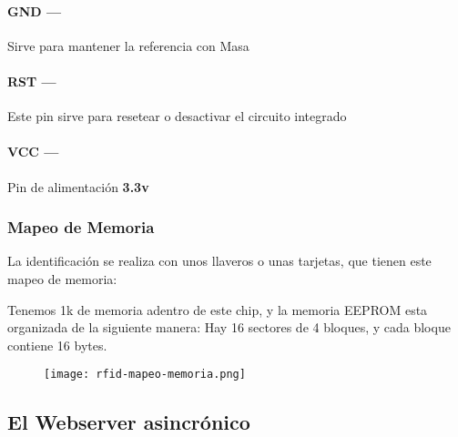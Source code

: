 \documentclass[../informe_krapp.tex]{subfiles}
\begin{document}
\paragraph{GND ---}
Sirve para mantener la referencia con Masa

\paragraph{RST ---}
Este pin sirve para resetear o desactivar el circuito integrado

\paragraph{VCC ---}
Pin de alimentación \textbf{3.3v}

\clearpage
\subsubsection{Mapeo de Memoria}
La identificación se realiza con unos llaveros o unas tarjetas,
que tienen este mapeo de memoria:

Tenemos 1k de memoria adentro de este chip, y la memoria EEPROM esta organizada de la
siguiente manera: Hay 16 sectores de 4 bloques, y cada bloque contiene 16 bytes.

\begin{figure}[H]
	\centering
	\texttt{[image: rfid-mapeo-memoria.png]}
\end{figure}






\subsection{El Webserver asincrónico}
\end{document}
